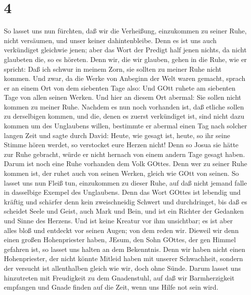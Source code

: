 \hypertarget{section-2}{%
\section{4}\label{section-2}}

 So lasset uns nun fürchten, daß wir die Verheißung,
einzukommen zu seiner Ruhe, nicht versäumen, und unser keiner
dahintenbleibe.  Denn es ist uns auch verkündiget gleichwie
jenen; aber das Wort der Predigt half jenen nichts, da nicht glaubeten
die, so es höreten.  Denn wir, die wir glauben, gehen in die
Ruhe, wie er spricht: Daß ich schwur in meinem Zorn, sie sollten zu
meiner Ruhe nicht kommen. Und zwar, da die Werke von Anbeginn der Welt
waren gemacht,  sprach er an einem Ort von dem siebenten
Tage also: Und GOtt ruhete am siebenten Tage von allen seinen Werken.
 Und hier an diesem Ort abermal: Sie sollen nicht kommen zu
meiner Ruhe.  Nachdem es nun noch vorhanden ist, daß etliche
sollen zu derselbigen kommen, und die, denen es zuerst verkündiget ist,
sind nicht dazu kommen um des Unglaubens willen,  bestimmte
er abermal einen Tag nach solcher langen Zeit und sagte durch David:
Heute, wie gesagt ist, heute, so ihr seine Stimme hören werdet, so
verstocket eure Herzen nicht!  Denn so Josua sie hätte zur
Ruhe gebracht, würde er nicht hernach von einem andern Tage gesagt
haben.  Darum ist noch eine Ruhe vorhanden dem Volk GOttes.
 Denn wer zu seiner Ruhe kommen ist, der ruhet auch von
seinen Werken, gleich wie GOtt von seinen.  So lasset uns
nun Fleiß tun, einzukommen zu dieser Ruhe, auf daß nicht jemand falle in
dasselbige Exempel des Unglaubens.  Denn das Wort GOttes
ist lebendig und kräftig und schärfer denn kein zweischneidig Schwert
und durchdringet, bis daß es scheidet Seele und Geist, auch Mark und
Bein, und ist ein Richter der Gedanken und Sinne des Herzens.
 Und ist keine Kreatur vor ihm unsichtbar; es ist aber
alles bloß und entdeckt vor seinen Augen; von dem reden wir.
 Dieweil wir denn einen großen Hohenpriester haben, JEsum,
den Sohn GOttes, der gen Himmel gefahren ist, so lasset uns halten an
dem Bekenntnis.  Denn wir haben nicht einen Hohenpriester,
der nicht könnte Mitleid haben mit unserer Schwachheit, sondern der
versucht ist allenthalben gleich wie wir, doch ohne Sünde. 
Darum lasset uns hinzutreten mit Freudigkeit zu dem Gnadenstuhl, auf daß
wir Barmherzigkeit empfangen und Gnade finden auf die Zeit, wenn uns
Hilfe not sein wird.

